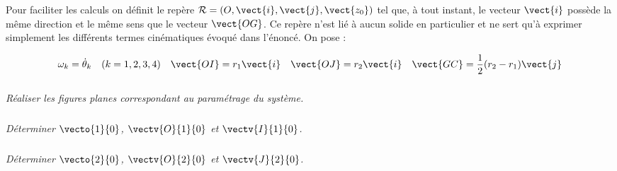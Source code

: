 Pour faciliter les calculs on définit le repère $\mathcal{R}=\left(O,\vect{i},\vect{j},\vect{z_0} \right)$ tel que, à tout instant, le vecteur $\vect{i}$ possède la même direction et le même sens que le vecteur $\vect{OG}$. Ce repère n'est lié à aucun solide en particulier et ne sert qu'à exprimer simplement les différents termes cinématiques évoqué dans l'énoncé. On pose :

$$
\omega_k = \dot{\theta}_k \quad (k=1,2,3,4) \quad \vect{OI}=r_1 \vect{i} \quad \vect{OJ}=r_2\vect{i} \quad \vect{GC}=\dfrac{1}{2}(r_2-r_1)\vect{j}
$$

\subparagraph{}
\textit{Réaliser les figures planes correspondant au paramétrage du système.}

\subparagraph{}
\textit{Déterminer $\vecto{1}{0}$,  $\vectv{O}{1}{0}$ et $\vectv{I}{1}{0}$.}



\subparagraph{}
\textit{Déterminer $\vecto{2}{0}$,  $\vectv{O}{2}{0}$ et $\vectv{J}{2}{0}$.}


